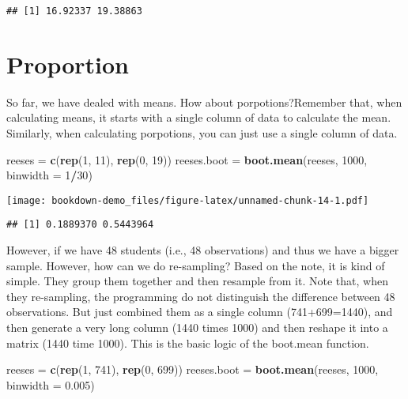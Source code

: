 \documentclass[]{book}
\newenvironment{Shaded}{\begin{snugshade}}{\end{snugshade}}
\newcommand{\DataTypeTok}[1]{\textcolor[rgb]{0.13,0.29,0.53}{#1}}
\newcommand{\DecValTok}[1]{\textcolor[rgb]{0.00,0.00,0.81}{#1}}
\newcommand{\FloatTok}[1]{\textcolor[rgb]{0.00,0.00,0.81}{#1}}
\newcommand{\KeywordTok}[1]{\textcolor[rgb]{0.13,0.29,0.53}{\textbf{#1}}}
\newcommand{\NormalTok}[1]{#1}
\newcommand{\OperatorTok}[1]{\textcolor[rgb]{0.81,0.36,0.00}{\textbf{#1}}}
\newcommand{\StringTok}[1]{\textcolor[rgb]{0.31,0.60,0.02}{#1}}
\begin{document}
\begin{verbatim}
## [1] 16.92337 19.38863
\end{verbatim}

\hypertarget{proportion}{%
\section{Proportion}\label{proportion}}

So far, we have dealed with means. How about porpotions?Remember that, when calculating means, it starts with a single column of data to calculate the mean. Similarly, when calculating porpotions, you can just use a single column of data.

\begin{Shaded}
\begin{Highlighting}[]
\NormalTok{reeses =}\StringTok{ }\KeywordTok{c}\NormalTok{(}\KeywordTok{rep}\NormalTok{(}\DecValTok{1}\NormalTok{, }\DecValTok{11}\NormalTok{), }\KeywordTok{rep}\NormalTok{(}\DecValTok{0}\NormalTok{, }\DecValTok{19}\NormalTok{))}
\NormalTok{reeses.boot =}\StringTok{ }\KeywordTok{boot.mean}\NormalTok{(reeses, }\DecValTok{1000}\NormalTok{, }\DataTypeTok{binwidth =} \DecValTok{1}\OperatorTok{/}\DecValTok{30}\NormalTok{)}
\end{Highlighting}
\end{Shaded}

\texttt{[image: bookdown-demo\_files/figure-latex/unnamed-chunk-14-1.pdf]}

\begin{verbatim}
## [1] 0.1889370 0.5443964
\end{verbatim}

However, if we have 48 students (i.e., 48 observations) and thus we have a bigger sample. However, how can we do re-sampling? Based on the note, it is kind of simple. They group them together and then resample from it. Note that, when they re-sampling, the programming do not distinguish the difference between 48 observations. But just combined them as a single column (741+699=1440), and then generate a very long column (1440 times 1000) and then reshape it into a matrix (1440 time 1000). This is the basic logic of the boot.mean function.

\begin{Shaded}
\begin{Highlighting}[]
\NormalTok{reeses =}\StringTok{ }\KeywordTok{c}\NormalTok{(}\KeywordTok{rep}\NormalTok{(}\DecValTok{1}\NormalTok{, }\DecValTok{741}\NormalTok{), }\KeywordTok{rep}\NormalTok{(}\DecValTok{0}\NormalTok{, }\DecValTok{699}\NormalTok{))}
\NormalTok{reeses.boot =}\StringTok{ }\KeywordTok{boot.mean}\NormalTok{(reeses, }\DecValTok{1000}\NormalTok{, }\DataTypeTok{binwidth =} \FloatTok{0.005}\NormalTok{)}
\end{Highlighting}
\end{Shaded}
\end{document}
